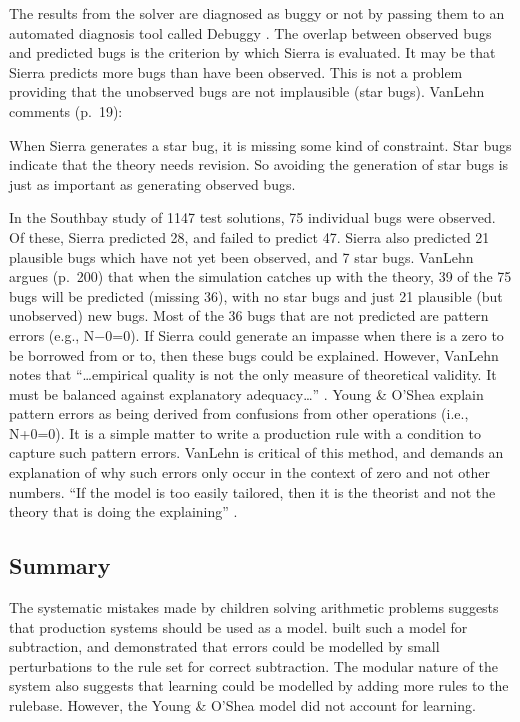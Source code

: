 The results from the solver
are diagnosed as buggy or not by passing them to an automated diagnosis
tool called Debuggy \cite{debuggy}.  The overlap between observed bugs and
predicted bugs is the criterion by which Sierra is evaluated. It may be that
Sierra predicts more bugs than have been observed.  This is not a problem
providing that the unobserved bugs are not implausible (star bugs).
VanLehn comments (p.~19):
\begin{ssquote}
When Sierra generates a star bug, it is missing some kind of constraint.
Star bugs indicate that the theory needs revision.  So avoiding the
generation of star bugs is just as important as generating observed bugs.
\end{ssquote}

In the Southbay study of 1147 test solutions, 75 individual bugs were
observed.  Of these, Sierra predicted 28, and failed to predict 47.  Sierra
also predicted 21 plausible bugs which have not yet been observed, and 7
star bugs.  VanLehn argues (p.~200) that when the simulation catches up
with the theory, 39 of the 75 bugs will be predicted (missing 36), with no
star bugs and just 21 plausible (but unobserved) new bugs.
Most of the 36 bugs that are not predicted are pattern errors (e.g.,
N$-$0=0).  If Sierra could generate an impasse when there is a zero to be
borrowed from or to, then these bugs could be explained.  However, VanLehn
notes that ``\ldots empirical quality is not the only measure of
theoretical validity.  \label{p:empirical}
It
must be balanced against explanatory
adequacy\ldots'' \citeyear[p.~205]{mindbugs}.  Young \& O'Shea explain
pattern errors as being derived from confusions from other operations
(i.e., N+0=0).  It is a simple matter to write a production rule with a
condition to capture such pattern errors.  VanLehn is critical of
this method, and demands an explanation of why such errors only occur in
the context of zero and not other numbers.  ``If the model is too easily
tailored, then it is the theorist and not the theory that is doing the
explaining'' \cite[p.~204]{mindbugs}.


\subsection{Summary}


The systematic mistakes made by children solving arithmetic problems
suggests that production systems should be used as a model.
 built such a model for subtraction, and demonstrated that
errors could be modelled by small perturbations to the rule set for correct
subtraction.  The modular nature of the system also suggests that learning
could be modelled by adding more rules to the rulebase.  However, the Young
\& O'Shea model did not account for learning.


